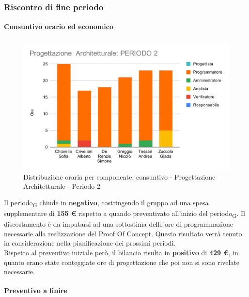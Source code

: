 \subsubsection{Riscontro di fine periodo}


\paragraph{Consuntivo orario ed economico}
\subparagraph*{}

\contabilitaTable{
	
}

\begin{figure}[H]
	\centering
	\includegraphics[scale=2]{res/images/charts/consuntivo/prog_arch_2.png}
	\caption{Distribuzione oraria per componente: consuntivo - Progettazione Architetturale - Periodo 2}
\end{figure}


Il periodo\textsubscript{G} chiude in \textbf{negativo}, costringendo il gruppo ad una spesa supplementare di \textbf{155 \euro} rispetto a quando preventivato all'inizio del periodo\textsubscript{G}. Il discostamento è da imputarsi ad una sottostima delle ore di programmazione necessarie alla realizzazione del Proof Of Concept. Questo risultato verrà tenuto in considerazione nella pianificazione dei prossimi periodi. \\
Rispetto al preventivo iniziale però, il bilancio risulta in \textbf{positivo} di \textbf{429 \euro}, in quanto erano state conteggiate ore di progettazione che poi non si sono rivelate necessarie.


\paragraph{Preventivo a finire}
\subparagraph*{}

